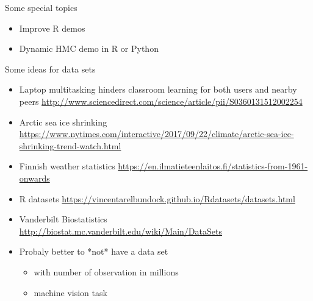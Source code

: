 \documentclass[t]{beamer}
\begin{document}
\begin{frame}
  
  {\Large\color{navyblue} Some special topics}

  \begin{itemize}
  \item Improve R demos
  \item Dynamic HMC demo in R or Python
  \end{itemize}
  
\end{frame}

\begin{frame}
  
  {\Large\color{navyblue} Some ideas for data sets}
  
  \begin{itemize}
  \item Laptop multitasking hinders classroom learning for both users
    and nearby peers
    \url{http://www.sciencedirect.com/science/article/pii/S0360131512002254}
  \item Arctic sea ice shrinking \url{https://www.nytimes.com/interactive/2017/09/22/climate/arctic-sea-ice-shrinking-trend-watch.html}
  \item Finnish weather statistics \url{https://en.ilmatieteenlaitos.fi/statistics-from-1961-onwards}
  \item R datasets \url{https://vincentarelbundock.github.io/Rdatasets/datasets.html}
  \item Vanderbilt Biostatistics \url{http://biostat.mc.vanderbilt.edu/wiki/Main/DataSets}
  \item Probaly better to *not* have a data set
    \begin{itemize}
    \item with number of observation in millions
    \item machine vision task
    \end{itemize}
  \end{itemize}
\end{frame}
\end{document}
